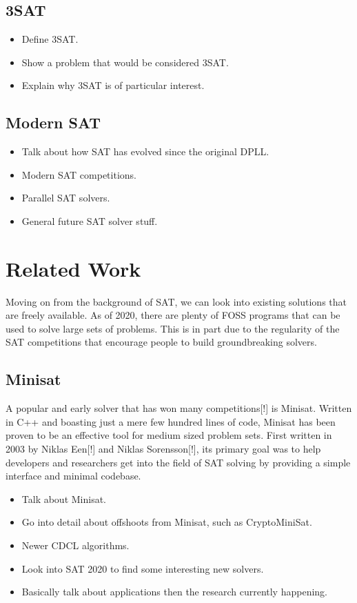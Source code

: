 \documentclass{article}
\begin{document}
\subsection{3SAT}
\begin{itemize}
    \item Define 3SAT.
    \item Show a problem that would be considered 3SAT.
    \item Explain why 3SAT is of particular interest.
\end{itemize}

\subsection{Modern SAT}
\begin{itemize}
    \item Talk about how SAT has evolved since the original DPLL.
    \item Modern SAT competitions.
    \item Parallel SAT solvers.
    \item General future SAT solver stuff.
\end{itemize}

\section{Related Work}
Moving on from the background of SAT, we can look into existing solutions that are freely available.
As of 2020, there are plenty of FOSS programs that can be used to solve large sets of problems. This
is in part due to the regularity of the SAT competitions that encourage people to build
groundbreaking solvers.

\subsection{Minisat}
A popular and early solver that has won many competitions[!] is Minisat. Written in C++ and boasting
just a mere few hundred lines of code, Minisat has been proven to be an effective tool for medium
sized problem sets. First written in 2003 by Niklas Een[!] and Niklas Sorensson[!], its primary goal
was to help developers and researchers get into the field of SAT solving by providing a simple
interface and minimal codebase.

\begin{itemize}
    \item Talk about Minisat.
    \item Go into detail about offshoots from Minisat, such as CryptoMiniSat.
    \item Newer CDCL algorithms.
    \item Look into SAT 2020 to find some interesting new solvers.
    \item Basically talk about applications then the research currently happening.
\end{itemize}
\end{document}
